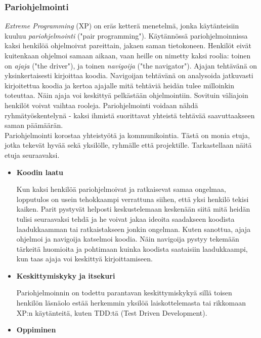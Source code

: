 \documentclass[finnish]{../tktltiki2}
\theoremstyle{definition}
\theoremstyle{remark}
\begin{document}
\subsubsection{Pariohjelmointi}

\emph{Extreme Programming} (XP) on eräs ketterä menetelmä, jonka käytänteisiin kuuluu \emph{pariohjelmointi} ("pair programming"). Käytännössä pariohjelmoinnissa kaksi henkilöä ohjelmoivat pareittain, jakaen saman tietokoneen. Henkilöt eivät kuitenkaan ohjelmoi samaan aikaan, vaan heille on nimetty kaksi roolia: toinen on \emph{ajaja} ("the driver"), ja toinen \emph{navigoija} ("the navigator"). Ajajan tehtävänä on yksinkertaisesti kirjoittaa koodia. Navigoijan tehtävänä on analysoida jatkuvasti kirjoitettua koodia ja kertoa ajajalle mitä tehtäviä heidän tulee milloinkin toteuttaa. Näin ajaja voi keskittyä pelkästään ohjelmointiin. Sovituin väliajoin henkilöt voivat vaihtaa rooleja. Pariohjelmointi voidaan nähdä ryhmätyöskentelynä - kaksi ihmistä suorittavat yhteistä tehtävää saavuttaakseen saman päämäärän.~\cite{Shore:2007:AAD:1407480} \\

Pariohjelmointi korostaa yhteistyötä ja kommunikointia. Tästä on monia etuja, jotka tekevät hyvää sekä yksilölle, ryhmälle että projektille. Tarkastellaan näitä etuja seuraavaksi. 

\begin{itemize}

\item {\bf Koodin laatu}

Kun kaksi henkilöä pariohjelmoivat ja ratkaisevat samaa ongelmaa, lopputulos on usein tehokkaampi verrattuna siihen, että yksi henkilö tekisi kaiken. Parit pystyvät helposti keskustelemaan keskenään siitä mitä heidän tulisi seuraavaksi tehdä ja he voivat jakaa ideoita saadakseen koodista laadukkaamman tai ratkaistakseen jonkin ongelman. Kuten sanottua, ajaja ohjelmoi ja navigoija katselmoi koodia. Näin navigoija pystyy tekemään tärkeitä huomioita ja pohtimaan kuinka koodista saataisiin laadukkaampi, kun taas ajaja voi keskittyä kirjoittamiseen.

\item {\bf Keskittymiskyky ja itsekuri}

Pariohjelmoinnin on todettu parantavan keskittymiskykyä sillä toisen henkilön läsnäolo estää herkemmin yksilöä laiskottelemasta tai rikkomaan XP:n käytänteitä, kuten TDD:tä (Test Driven Development).

\item {\bf Oppiminen}


\end{itemize}
\end{document}
